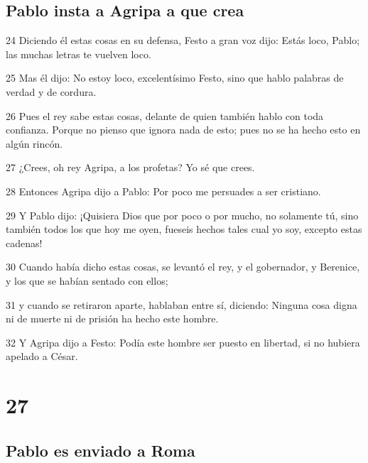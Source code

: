\section*{Pablo insta a Agripa a que crea}

\par 24 Diciendo él estas cosas en su defensa, Festo a gran voz dijo: Estás loco, Pablo; las muchas letras te vuelven loco.
\par 25 Mas él dijo: No estoy loco, excelentísimo Festo, sino que hablo palabras de verdad y de cordura.
\par 26 Pues el rey sabe estas cosas, delante de quien también hablo con toda confianza. Porque no pienso que ignora nada de esto; pues no se ha hecho esto en algún rincón.
\par 27 ¿Crees, oh rey Agripa, a los profetas? Yo sé que crees.
\par 28 Entonces Agripa dijo a Pablo: Por poco me persuades a ser cristiano.
\par 29 Y Pablo dijo: ¡Quisiera Dios que por poco o por mucho, no solamente tú, sino también todos los que hoy me oyen, fueseis hechos tales cual yo soy, excepto estas cadenas!
\par 30 Cuando había dicho estas cosas, se levantó el rey, y el gobernador, y Berenice, y los que se habían sentado con ellos;
\par 31 y cuando se retiraron aparte, hablaban entre sí, diciendo: Ninguna cosa digna ni de muerte ni de prisión ha hecho este hombre.
\par 32 Y Agripa dijo a Festo: Podía este hombre ser puesto en libertad, si no hubiera apelado a César.

\chapter{27}

\section*{Pablo es enviado a Roma}

